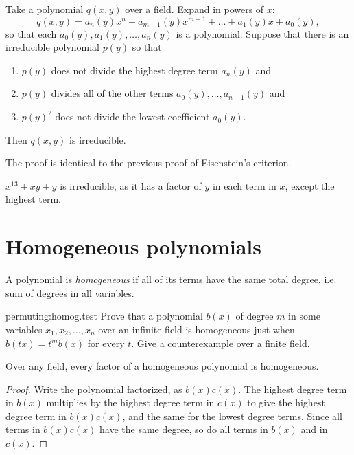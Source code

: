 \begin{proposition}
Take a polynomial \(q(x,y)\) over a field.
Expand in powers of \(x\):
\[
q(x,y) = a_n(y) x^n + a_{m-1}(y) x^{m-1} + \dots + a_1(y) x + a_0(y),
\]
so that each \(a_0(y),a_1(y),\dots,a_n(y)\) is a polynomial.
Suppose that there is an irreducible polynomial \(p(y)\) so that
\begin{enumerate}
\item 
\(p(y)\) does not divide the highest degree term \(a_n(y)\) and
\item
\(p(y)\) divides all of the other terms \(a_0(y),\dots,a_{n-1}(y)\) and
\item
\(p(y)^2\) does not divide the lowest coefficient \(a_0(y)\).
\end{enumerate}
Then \(q(x,y)\) is irreducible.
\end{proposition}
The proof is identical to the previous proof of Eisenstein's criterion.
\begin{example}
\(x^{13}+xy+y\) is irreducible, as it has a factor of \(y\) in each term in \(x\), except the highest term.
\end{example}

\section{Homogeneous polynomials}
A polynomial is \emph{homogeneous} if all of its terms have the same total degree, i.e. sum of degrees in all variables.
\begin{problem}{permuting:homog.test}
Prove that a polynomial \(b(x)\) of degree \(m\) in some variables \(x_1,x_2,\dots,x_n\) over an infinite field is homogeneous just when \(b(tx)=t^mb(x)\) for every \(t\).
Give a counterexample over a finite field.
\end{problem}
\begin{lemma}
Over any field, every factor of a homogeneous polynomial is homogeneous.
\end{lemma}
\begin{proof}
Write the polynomial factorized, as
\(
b(x)c(x)
\).
The highest degree term in \(b(x)\) multiplies by the highest degree term in \(c(x)\) to give the highest degree term in \(b(x)c(x)\), and the same for the lowest degree terms.
Since all terms in \(b(x)c(x)\) have the same degree, so do all terms in \(b(x)\) and in \(c(x)\).
\end{proof}


